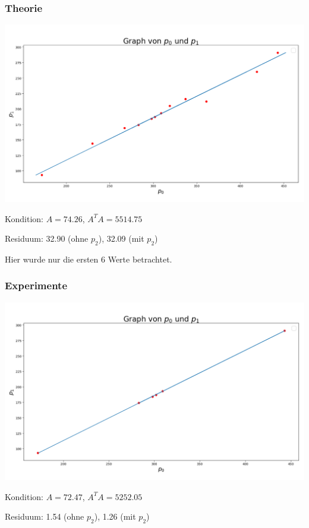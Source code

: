 \documentclass{beamer}
\begin{document}
\begin{frame}
    \frametitle{Theorie}
    \includegraphics[width=\textwidth]{plot.png}
    
    Kondition: \(A = 74.26\), \(A^T A = 5514.75\)

    Residuum: 32.90 (ohne \(p_2\)), 32.09 (mit \(p_2\))
\end{frame}

\begin{frame}
Hier wurde nur die ersten 6 Werte betrachtet.

\frametitle{Experimente}
\includegraphics[width=\textwidth]{plot1.png}

Kondition: $A = 72.47$, $A^T A = 5252.05$

Residuum: 1.54 (ohne $p_2$), 1.26 (mit $p_2$)
\end{frame}
\end{document}
